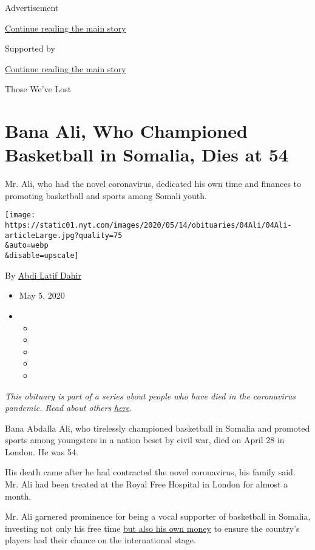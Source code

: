 Advertisement

\protect\hyperlink{after-top}{Continue reading the main story}

Supported by

\protect\hyperlink{after-sponsor}{Continue reading the main story}

Those We've Lost

\hypertarget{bana-ali-who-championed-basketball-in-somalia-dies-at-54}{%
\section{Bana Ali, Who Championed Basketball in Somalia, Dies at
54}\label{bana-ali-who-championed-basketball-in-somalia-dies-at-54}}

Mr. Ali, who had the novel coronavirus, dedicated his own time and
finances to promoting basketball and sports among Somali youth.

\texttt{[image: https://static01.nyt.com/images/2020/05/14/obituaries/04Ali/04Ali-articleLarge.jpg?quality=75\\\&auto=webp\\\&disable=upscale]}

By \href{https://www.nytimes.com/by/abdi-latif-dahir}{Abdi Latif Dahir}

\begin{itemize}
\item
  May 5, 2020
\item
  \begin{itemize}
  \item
  \item
  \item
  \item
  \item
  \end{itemize}
\end{itemize}

\emph{This obituary is part of a series about people who have died in
the coronavirus pandemic. Read about others}
\href{https://www.nytimes.com/series/people-who-have-died-of-the-coronavirus}{\emph{here}}\emph{.}

Bana Abdalla Ali, who tirelessly championed basketball in Somalia and
promoted sports among youngsters in a nation beset by civil war, died on
April 28 in London. He was 54.

His death came after he had contracted the novel coronavirus, his family
said. Mr. Ali had been treated at the Royal Free Hospital in London for
almost a month.

Mr. Ali garnered prominence for being a vocal supporter of basketball in
Somalia, investing not only his free time
\href{https://twitter.com/JustAwHirsi/status/1255084776287068161}{but
also his own money} to ensure the country's players had their chance on
the international stage.

